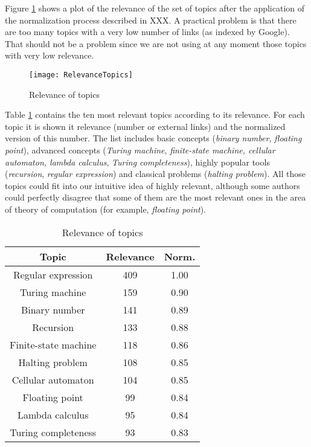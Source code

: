 Figure \ref{fig:Relevance-of-Topics} shows a plot of the relevance of the set of topics after the application of the normalization process described in {\color{red} XXX}. A practical problem is that there are too many topics with a very low number of links (as indexed by Google). That should not be a problem since we are not using at any moment those topics with very low relevance.

\begin{figure}[h]
\centering\texttt{[image: RelevanceTopics]}
\caption{\label{fig:Relevance-of-Topics}Relevance of topics}
\end{figure}

Table \ref{tab:Relevance-of-Topics} contains the ten most relevant topics according to its relevance. For each topic it is shown it relevance (number or external links) and the normalized version of this number. The list includes basic concepts (\emph{binary number,} \emph{floating point}), advanced concepts (\emph{Turing machine}, \emph{finite-state machine, cellular automaton, lambda calculus}, \emph{Turing completeness}), highly popular tools (\emph{recursion}, \emph{regular expression}) and classical problems (\emph{halting problem}). All those topics could fit into our intuitive idea of highly relevant, although some authors could perfectly disagree that some of them are the most relevant ones in the area of theory of computation (for example, \emph{floating point}).

\begin{table}
\begin{centering}
\begin{tabular}{|c|c|c|}
\hline 
Topic & Relevance & Norm.\tabularnewline
\hline 
\hline 
Regular expression & 409 & 1.00\tabularnewline
\hline 
Turing machine & 159 & 0.90\tabularnewline
\hline 
Binary number & 141 & 0.89\tabularnewline
\hline 
Recursion & 133 & 0.88\tabularnewline
\hline 
Finite-state machine & 118 & 0.86\tabularnewline
\hline 
Halting problem & 108 & 0.85\tabularnewline
\hline 
Cellular automaton & 104 & 0.85\tabularnewline
\hline 
Floating point & 99 & 0.84\tabularnewline
\hline 
Lambda calculus & 95 & 0.84\tabularnewline
\hline 
Turing completeness & 93 & 0.83\tabularnewline
\hline 
\end{tabular}
\par\end{centering}

\caption{\label{tab:Relevance-of-Topics}Relevance of topics}
\end{table}

